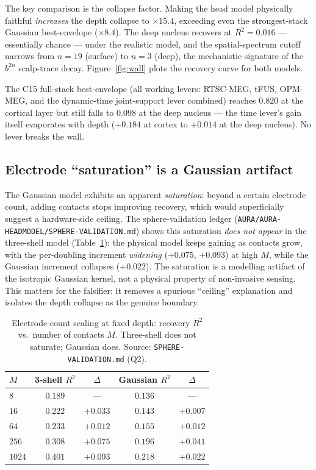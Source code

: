 \documentclass[11pt]{article}
\newcommand{\Rsq}{R^{2}}
\begin{document}
The key comparison is the collapse factor. Making the head model physically faithful
\emph{increases} the depth collapse to $\times 15.4$, exceeding even the
strongest-stack Gaussian best-envelope ($\times 8.4$). The deep nucleus recovers at
$\Rsq = 0.016$ --- essentially chance --- under the realistic model, and the
spatial-spectrum cutoff narrows from $n=19$ (surface) to $n=3$ (deep), the
mechanistic signature of the $b^{2n}$ scalp-trace decay. Figure~\ref{fig:wall} plots
the recovery curve for both models.

The C15 full-stack best-envelope (all working levers: RTSC-MEG, tFUS, OPM-MEG, and
the dynamic-time joint-support lever combined) reaches $0.820$ at the cortical layer
but still falls to $0.098$ at the deep nucleus --- the time lever's gain itself
evaporates with depth ($+0.184$ at cortex to $+0.014$ at the deep nucleus). No lever
breaks the wall.

\subsection{Electrode ``saturation'' is a Gaussian artifact}
\label{sec:saturation}

The Gaussian model exhibits an apparent \emph{saturation}: beyond a certain electrode
count, adding contacts stops improving recovery, which would superficially suggest a
hardware-side ceiling. The sphere-validation ledger
(\texttt{AURA/AURA-HEADMODEL/SPHERE-VALIDATION.md}) shows this saturation
\emph{does not appear} in the three-shell model (Table~\ref{tab:saturation}): the
physical model keeps gaining as contacts grow, with the per-doubling increment
\emph{widening} ($+0.075$, $+0.093$) at high $M$, while the Gaussian increment
collapses ($+0.022$). The saturation is a modelling artifact of the isotropic
Gaussian kernel, not a physical property of non-invasive sensing. This matters for
the falsifier: it removes a spurious ``ceiling'' explanation and isolates the depth
collapse as the genuine boundary.

\begin{table}[h]
\centering
\caption{Electrode-count scaling at fixed depth: recovery $\Rsq$ vs.\ number of
contacts $M$. Three-shell does not saturate; Gaussian does. Source:
\texttt{SPHERE-VALIDATION.md} (Q2).}
\label{tab:saturation}
\begin{tabular}{lcccc}
\toprule
$M$ & 3-shell $\Rsq$ & $\Delta$ & Gaussian $\Rsq$ & $\Delta$ \\
\midrule
$8$    & $0.189$ & ---      & $0.136$ & ---      \\
$16$   & $0.222$ & $+0.033$ & $0.143$ & $+0.007$ \\
$64$   & $0.233$ & $+0.012$ & $0.155$ & $+0.012$ \\
$256$  & $0.308$ & $+0.075$ & $0.196$ & $+0.041$ \\
$1024$ & $\mathbf{0.401}$ & $\mathbf{+0.093}$ & $0.218$ & $+0.022$ \\
\bottomrule
\end{tabular}
\end{table}
\end{document}
